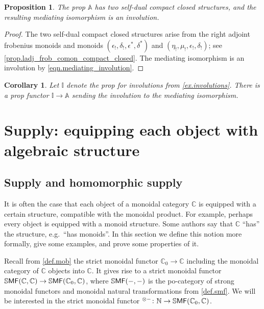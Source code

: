 \documentclass[11pt, oneside, article]{memoir}
\theoremstyle{plain}
\newtheorem{proposition}[theorem]{Proposition}
\newtheorem{corollary}[theorem]{Corollary}
\theoremstyle{definition}
\theoremstyle{remark}
\newcommand{\ccat}[1]{\mathbb{#1}}%
\newcommand{\Cat}[1]{{\mathsf{#1}}}%
\newcommand{\CCat}[1]{\mathbb{\StrLeft{#1}{1}}\Cat{\StrGobbleLeft{#1}{1}}}%
\newcommand{\ssmf}{\CCat{SMF}}
\renewcommand{\aa}{\mathbb{A}} %
\newcommand{\cc}{\mathbb{C}}
\newcommand{\nn}{\mathbb{N}}
\newcommand{\mob}[1]{#1_0}
\newcommand{\lsh}[1]{#1_!}
\newcommand{\ust}[1]{#1^\ast}
\begin{document}

\begin{proposition}\label{prop.aa_two_ccc_structures}
The prop $\aa$ has two self-dual compact closed structures, and the resulting mediating isomorphism is an involution.
\end{proposition}
\begin{proof}
The two self-dual compact closed structures arise from the right adjoint frobenius monoids and monoids $(\lsh{\epsilon},\lsh{\delta},\ust{\epsilon},\ust{\delta})$ and $(\lsh{\eta},\lsh{\mu},\lsh{\epsilon},\lsh{\delta})$; see \cref{prop.ladj_frob_comon_compact_closed}. The mediating isomorphism is an involution by \cref{eqn.mediating_involution}.
\end{proof}

\begin{corollary}\label{cor.aa_supplies_involutions}
Let $\ccat{I}$ denote the prop for involutions from \cref{ex.involutions}. There is a prop functor $\ccat{I}\to\aa$ sending the involution to the mediating isomorphism.
\end{corollary}

\chapter{Supply: equipping each object with algebraic structure}

\section{Supply and homomorphic supply}

It is often the case that each object of a monoidal category $\cc$ is equipped with a certain structure, compatible with the monoidal product. For example, perhaps every object is equipped with a monoid structure. Some authors say that $\cc$ ``has'' the structure, e.g.\ ``has monoids''. In this section we define this notion more formally, give some examples, and prove some properties of it.

Recall from \cref{def.mob} the strict monoidal functor $\mob{\cc}\to\cc$ including the monoidal category of $\cc$ objects into $\cc$. It gives rise to a strict monoidal functor $\ssmf(\cc,\cc)\to\ssmf(\mob{\cc},\cc)$, where $\ssmf(-,-)$ is the po-category of strong monoidal functors and monoidal natural transformations from \cref{def.smf}. We will be interested in the strict monoidal functor $^{\otimes-}\colon\nn\to\ssmf(\mob{\cc},\cc)$.
\end{document}
